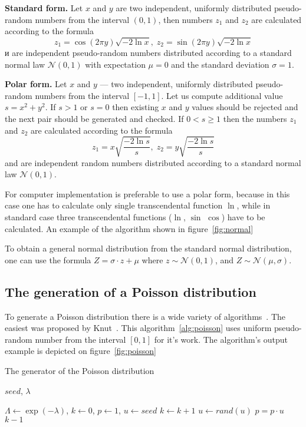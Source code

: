 \documentclass[%
floatfix,
showkeys,
nofootinbib, %
superscriptaddress, %
]{revtex4-1}
\begin{document}
\textbf{Standard form.} Let $x$ and $y$ are two independent, uniformly
distributed pseudo-random numbers from the interval $(0, 1)$, then
numbers $z_1$ and $z_2$ are calculated according to the formula
\[
  z_{1} = \cos(2\pi y)\sqrt{-2\ln{x}},\; z_{2} = \sin(2\pi y)\sqrt{-2\ln{x}}
\]
и are independent pseudo-random numbers distributed according to a
standard normal law $\mathcal{N}(0,1)$ with expectation $\mu = 0$ and
the standard deviation $\sigma = 1$.

\textbf{Polar form.} Let $x$ and $y$ --- two independent, uniformly
distributed pseudo-random numbers from the interval $[-1, 1]$. Let us
compute additional value $s = x^2 + y^2$. If $s>1$ or $s=0$ then
existing $x$ and $y$ values should be rejected and the next pair
should be generated and checked. If $0 < s \geqslant 1$ then the
numbers $z_1$ and $z_2$ are calculated according to the formula
\[
  z_1 = x\sqrt{\dfrac{-2\ln{s}}{s}},\; z_2 = y \sqrt{\dfrac{-2\ln{s}}{s}}
\]
and are independent random numbers distributed according to a standard
normal law $\mathcal{N}(0,1)$.

For computer implementation is preferable to use a polar form, because
in this case one has to calculate only single transcendental function
$\ln$, while in standard case three transcendental functions ($\ln$,
$\sin$ $\cos$) have to be calculated. An example of the algorithm
shown in figure~\ref{fig:normal}

To obtain a general normal distribution from the standard normal
distribution, one can use the formula $Z = \sigma \cdot z + \mu$ where
$z \sim \mathcal{N}(0,1)$, and $Z \sim \mathcal{N}(\mu,\sigma)$.


\subsection{The generation of a Poisson distribution}
To generate a Poisson distribution there is a wide variety of
algorithms~\cite{L_Devroye, L_Ahrens:1974, L_Ahrens:1982}. The easiest
was proposed by Knut~\cite{L_DKnuth:1997:en}. This
algorithm~\ref{alg:poisson} uses uniform pseudo-random number from the
interval $[0,1]$ for it's work. The algorithm's output example is
depicted on figure~\ref{fig:poisson}
\begin{algorithm}[H]
  \caption{The generator of the Poisson distribution}\label{alg:poisson}
  \begin{algorithmic}
                \Require $seed$, $\lambda$
    
                \State $\Lambda \leftarrow \exp(-\lambda)$, $k \leftarrow 0$, $p \leftarrow 1$, $u \leftarrow seed$
    \Repeat
      \State $k \leftarrow k + 1$
                        \State $u \leftarrow rand(u)$ 
                        \State $p = p \cdot u$
    \State \Return $k - 1$
  \end{algorithmic}
\end{algorithm}
\end{document}
